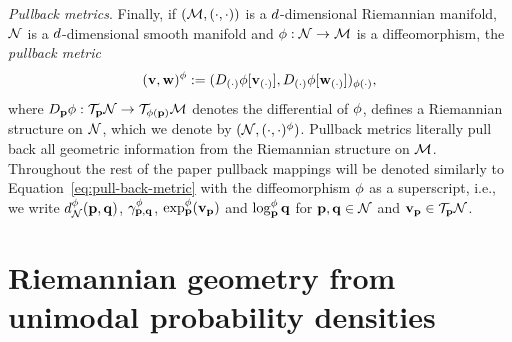 \textit{Pullback metrics}. Finally, if $(\mathcal{M}, (\cdot,\cdot))$ is a $d$-dimensional Riemannian manifold, $\mathcal{N}$ is a $d$-dimensional smooth manifold and $\phi:\mathcal{N} \to \mathcal{M}$ is a diffeomorphism, the \emph{pullback metric}
\begin{equation}
    (\mathbf{v}, \mathbf{w})^\phi := (D_{(\cdot)}\phi[\mathbf{v}_{(\cdot)}], D_{(\cdot)}\phi[\mathbf{w}_{(\cdot)}])_{\phi(\cdot)},
    \label{eq:pull-back-metric}
\end{equation}
where $D_{\mathbf{p}}\phi: \mathcal{T}_{\mathbf{p}} \mathcal{N} \to \mathcal{T}_{\phi(\mathbf{p})} \mathcal{M}$ denotes the differential of $\phi$,
defines a Riemannian structure on $\mathcal{N}$, which we denote by $(\mathcal{N}, (\cdot,\cdot)^\phi)$. 
Pullback metrics literally pull back all geometric information from the Riemannian structure on $\mathcal{M}$. 
Throughout the rest of the paper pullback mappings will be denoted similarly to Equation~\ref{eq:pull-back-metric} with the diffeomorphism $\phi$ as a superscript, i.e., we write $d^\phi_{\mathcal{N}}(\mathbf{p}, \mathbf{q})$, $\gamma^\phi_{\mathbf{p}, \mathbf{q}}$, $\exp^\phi_{\mathbf{p}} (\mathbf{v}_{\mathbf{p}})$ and $\log^\phi_{\mathbf{p}} \mathbf{q}$ 
for $\mathbf{p},\mathbf{q} \in \mathcal{N}$ and $\mathbf{v}_{\mathbf{p}} \in \mathcal{T}_{\mathbf{p}} \mathcal{N}$. 


\section{Riemannian geometry from unimodal probability densities}
\label{sec:unimodal-riemannian geometry}

